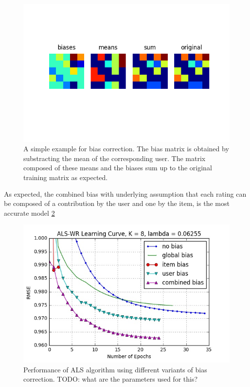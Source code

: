 \begin{figure}[htbp]
  \centering
  \includegraphics[width=.7\columnwidth]{figures/biases_user.png}
  \vspace{-3mm}
  \caption{A simple example for bias correction. The bias matrix is obtained by
  substracting the mean of the corresponding user. The matrix composed of these
  means and the biases sum up to the original training matrix as expected.}
  \label{fig:matrix}
\end{figure}

As expected, the combined bias with underlying assumption that each rating can
  be composed of a contribution by the user and one by the item, is the most
  accurate model \ref{fig:bias} 

\begin{figure}[htbp]
  \centering
  \includegraphics[width=.7\columnwidth]{figures/bias.jpg}
  \vspace{-3mm}
  \caption{Performance of ALS algorithm using different variants of bias
  correction. TODO: what are the parameters used for this? }
  \label{fig:bias}
\end{figure}

